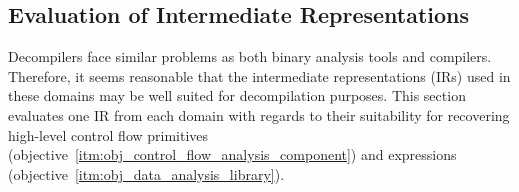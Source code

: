 
\subsection{Evaluation of Intermediate Representations}

Decompilers face similar problems as both binary analysis tools and compilers. Therefore, it seems reasonable that the intermediate representations (IRs) used in these domains may be well suited for decompilation purposes. This section evaluates one IR from each domain with regards to their suitability for recovering high-level control flow primitives (objective~\ref{itm:obj_control_flow_analysis_component}) and expressions (objective~\ref{itm:obj_data_analysis_library}).




